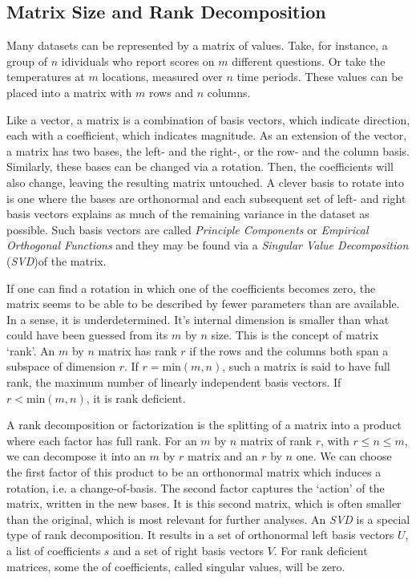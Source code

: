 \documentclass{acm_proc_article-sp}
\begin{document}
\subsection{Matrix Size and Rank Decomposition}
\label{sec:Introduction Matrix Size and Rank Decomposition}

Many datasets can be represented by a matrix of values. Take, for instance, a group of $n$ idividuals who report scores on $m$ different questions. Or take the temperatures at $m$ locations, measured over $n$ time periods. These values can be placed into a matrix with $m$ rows and $n$ columns.

Like a vector, a matrix is a combination of basis vectors, which indicate direction, each with a coefficient, which indicates magnitude. As an extension of the vector, a matrix has two bases, the left- and the right-, or the row- and the column basis. Similarly, these bases can be changed via a rotation. Then, the coefficients will also change, leaving the resulting matrix untouched. A clever basis to rotate into is one where the bases are orthonormal and each subsequent set of left- and right basis vectors explains as much of the remaining variance in the dataset as possible. Such basis vectors are called \textit{Principle Components} or \textit{Empirical Orthogonal Functions} and they may be found via a \textit{Singular Value Decomposition} (\textit{SVD})of the matrix.

If one can find a rotation in which one of the coefficients becomes zero, the matrix seems to be able to be described by fewer parameters than are available. In a sense, it is underdetermined. It's internal dimension is smaller than what could have been guessed from its $m$ by $n$ size. This is the concept of matrix `rank'. An $m$ by $n$ matrix has rank $r$ if the rows and the columns both span a subspace of dimension $r$. If $r = \text{min}(m, n)$, such a matrix is said to have full rank, the maximum number of linearly independent basis vectors. If $r < \text{min}(m, n)$, it is rank deficient.

A rank decomposition or factorization is the splitting of a matrix into a product where each factor has full rank. For an $m$ by $n$ matrix of rank $r$, with $r \leq n \leq m$, we can decompose it into an $m$ by $r$ matrix and an $r$ by $n$ one. We can choose the first factor of this product to be an orthonormal matrix which induces a rotation, i.e. a change-of-basis. The second factor captures the `action' of the matrix, written in the new bases. It is this second matrix, which is often smaller than the original, which is most relevant for further analyses. An \textit{SVD} is a special type of rank decomposition. It results in a set of orthonormal left basis vectors $U$, a list of coefficients $s$ and a set of right basis vectors $V$. For rank deficient matrices, some the of coefficients, called singular values, will be zero.
\end{document}
